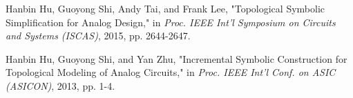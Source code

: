 
\begin{publications}{99}
	\item Hanbin Hu, Guoyong Shi, Andy Tai, and Frank Lee, "Topological Symbolic Simplification for Analog Design," in \textit{Proc. IEEE Int'l Symposium on Circuits and Systems (ISCAS)}, 2015, pp. 2644-2647.
    \item Hanbin Hu, Guoyong Shi, and Yan Zhu, "Incremental Symbolic Construction for Topological Modeling of Analog Circuits," in \textit{Proc. IEEE Int'l Conf. on ASIC (ASICON)}, 2013, pp. 1-4.
\end{publications}
